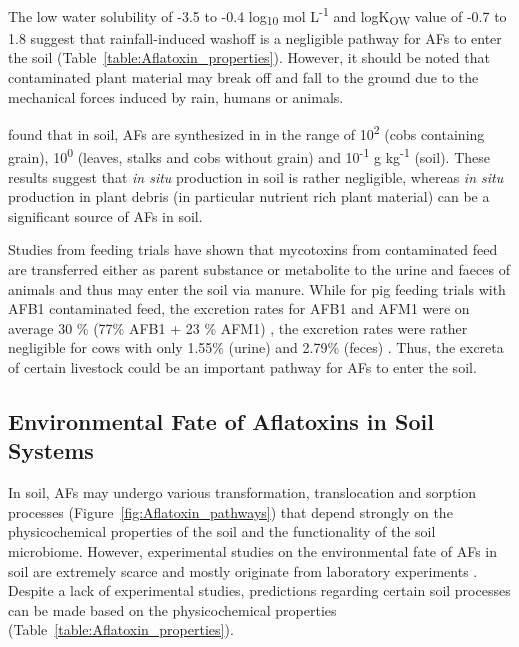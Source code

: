The low water solubility of -3.5 to -0.4 log\textsubscript{10} mol L\textsuperscript{-1} and logK\textsubscript{OW} value of -0.7 to 1.8 suggest that rainfall-induced washoff is a negligible pathway for AFs to enter the soil (Table~\ref{table:Aflatoxin_properties}). However, it should be noted that contaminated plant material may break off and fall to the ground due to the mechanical forces induced by rain, humans or animals. 


\citet{accinelli2008aspergillus} found that in soil, AFs are synthesized in in the range of 10\textsuperscript{2} (cobs containing grain), 10\textsuperscript{0} (leaves, stalks and cobs without grain) and 10\textsuperscript{-1} \textmu g kg\textsuperscript{-1} (soil). These results suggest that \textit{in situ} production in soil is rather negligible, whereas \textit{in situ} production in plant debris (in particular nutrient rich plant material) can be a significant source of AFs in soil. 

Studies from feeding trials have shown that mycotoxins from contaminated feed are transferred either as parent substance or metabolite to the urine and faeces of animals \citep{elmholt2008mycotoxins} and thus may enter the soil via manure. While for pig feeding trials with AFB1 contaminated feed, the excretion rates for AFB1 and AFM1 were on average 30 \% (77\% AFB1 + 23 \% AFM1) \citep{thieu2009zearalenone}, the excretion rates were rather negligible for cows with only 1.55\% (urine) and 2.79\% (feces) \citep{allcroft1968excretion}. Thus, the excreta of certain livestock could be an important pathway for AFs to enter the soil.

\hfill

 

\subsection{Environmental Fate of Aflatoxins in Soil Systems} \label{subchap:dissipation}

In soil, AFs may undergo various transformation, translocation and sorption processes (Figure~\ref{fig:Aflatoxin_pathways}) that depend strongly on the physicochemical properties of the soil and the functionality of the soil microbiome. However, experimental studies on the environmental fate of AFs in soil are extremely scarce and mostly originate from laboratory experiments \citep{elmholt2008mycotoxins}. Despite a lack of experimental studies, predictions regarding certain soil processes can be made based on the physicochemical properties (Table~\ref{table:Aflatoxin_properties}). 

